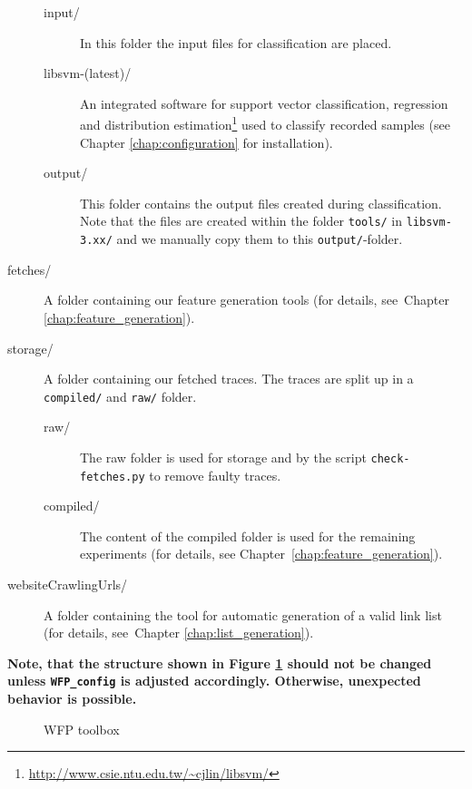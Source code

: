 \begin{description}
\begin{description}
\item[input/] In this folder the input files for classification are placed.
\item[libsvm-(latest)/] An integrated software for support vector classification, regression and distribution estimation\footnote{\url{http://www.csie.ntu.edu.tw/~cjlin/libsvm/}} used to classify recorded samples (see Chapter \ref{chap:configuration} for installation).
\item[output/] This folder contains the output files created during classification. Note that the files are created within the folder \texttt{tools/} in \texttt{libsvm-3.xx/} and we manually copy them to this \texttt{output/}-folder.
\end{description}
\item[fetches/] A folder containing our feature generation tools (for details, see~Chapter \ref{chap:feature_generation}).
\item[storage/] A folder containing our fetched traces. The traces are split up in a \texttt{compiled/} and \texttt{raw/} folder.
\begin{description}
\item[raw/] The raw folder is used for storage and by the script \texttt{check-fetches.py} to remove faulty traces.
\item[compiled/] The content of the compiled folder is used for the remaining experiments (for details, see Chapter~\ref{chap:feature_generation}).
\end{description}
\item[websiteCrawlingUrls/] A folder containing the tool for automatic generation of a valid link list (for details, see~Chapter \ref{chap:list_generation}).
\end{description}

\textbf{Note, that the structure shown in Figure \ref{fig:folderOrdering} should not be changed unless \texttt{WFP\_config} is adjusted accordingly. Otherwise, unexpected behavior is possible.}

\begin{figure}
\caption{\ac{WFP} toolbox}
\label{fig:folderOrdering}
\end{figure}

